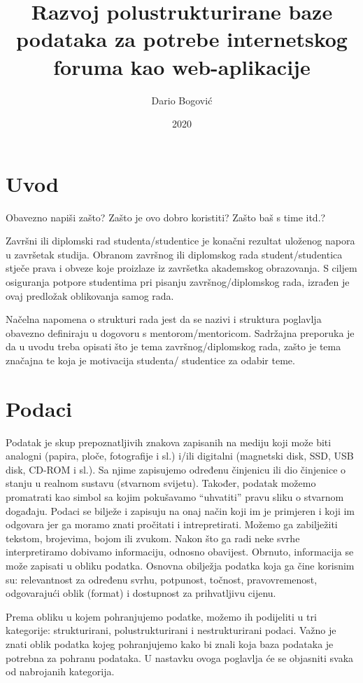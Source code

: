 \documentclass{foi}
\title{Razvoj polustrukturirane baze podataka za potrebe internetskog foruma kao web-aplikacije}
\author{Dario Bogović}
\date{2020}
\begin{document}
\maketitle

\tableofcontents

\pagestyle{plain}
\chapter{Uvod}

Obavezno napiši zašto? Zašto je ovo dobro koristiti? Zašto baš s time itd.?

Završni ili diplomski rad studenta/studentice je konačni rezultat uloženog napora u završetak studija. Obranom završnog ili diplomskog rada student/studentica stječe prava i obveze koje proizlaze iz završetka akademskog obrazovanja. S ciljem osiguranja potpore studentima pri pisanju završnog/diplomskog rada, izrađen je ovaj predložak oblikovanja samog rada.

Načelna napomena o strukturi rada jest da se nazivi i struktura poglavlja obavezno definiraju u dogovoru s mentorom/mentoricom. Sadržajna preporuka je da u uvodu treba opisati što je tema završnog/diplomskog rada, zašto je tema značajna te koja je motivacija studenta/ studentice za odabir teme. 

\chapter{Podaci}

Podatak je skup prepoznatljivih znakova zapisanih na mediju koji može biti analogni (papira, ploče, fotografije i sl.)  i/ili digitalni (magnetski disk, SSD, USB disk, CD-ROM i sl.). Sa njime zapisujemo određenu činjenicu ili dio činjenice o stanju u realnom sustavu (stvarnom svijetu). Također, podatak možemo promatrati kao simbol sa kojim pokušavamo “uhvatiti” pravu sliku o stvarnom događaju. Podaci se bilježe i zapisuju na onaj način koji im je primjeren i koji im odgovara jer ga moramo znati pročitati i intrepretirati. Možemo ga zabilježiti tekstom, brojevima, bojom ili zvukom. Nakon što ga radi neke svrhe interpretiramo dobivamo informaciju, odnosno obavijest. Obrnuto, informacija se može zapisati u obliku podatka. Osnovna obilježja podatka koja ga čine korisnim su: relevantnost za određenu svrhu, potpunost, točnost, pravovremenost, odgovarajući oblik (format) i dostupnost za prihvatljivu cijenu. \cite{poslovnoRacunarstvo}

Prema obliku u kojem pohranjujemo podatke, možemo ih podijeliti u tri kategorije: strukturirani, polustrukturirani i nestrukturirani podaci. Važno je znati oblik podatka kojeg pohranjujemo kako bi znali koja baza podataka je potrebna za pohranu podataka. \cite{dataEngineerStudyGuide}  U nastavku ovoga poglavlja će se objasniti svaka od nabrojanih kategorija.
\end{document}
